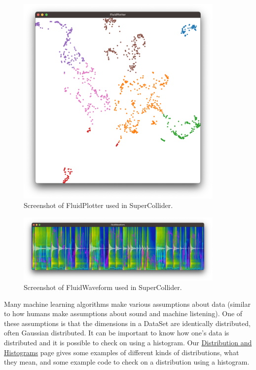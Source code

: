 \documentclass{article}
\begin{document}
\begin{figure}[H]
\centering
\includegraphics[width=0.9\textwidth]{./figures/fluidplotter.png}
\caption{Screenshot of FluidPlotter used in SuperCollider.}
\label{fig:fluid-plotter}
\end{figure}

\begin{figure}[H]
\centering
\includegraphics[width=0.9\textwidth]{./figures/fluidwaveform.png}
\caption{Screenshot of FluidWaveform used in SuperCollider.}
\label{fig:fluid-waveform}
\end{figure}

Many machine learning algorithms make various assumptions about data
(similar to how humans make assumptions about sound and machine
listening). One of these assumptions is that the dimensions in a DataSet
are identically distributed, often Gaussian distributed. It can be
important to know how one's data is distributed and it is possible to
check on using a histogram. Our
\href{https://learn.flucoma.org/learn/distribution/}{Distribution and
Histograms} page gives some examples of different kinds of
distributions, what they mean, and some example code to check on a
distribution using a histogram.
\end{document}
